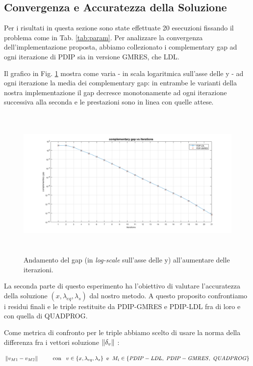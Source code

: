 \subsection{Convergenza e Accuratezza della Soluzione}

Per i risultati in questa sezione sono state effettuate 20 esecuzioni fissando il problema come in Tab. \ref{tab:param}.
Per analizzare la convergenza dell'implementazione proposta, abbiamo collezionato i complementary gap ad ogni iterazione di PDIP sia in versione GMRES, che LDL.

Il grafico in Fig. \ref{fig:gap} mostra come varia - in scala logaritmica sull'asse delle y - ad ogni iterazione la media dei complementary gap: in entrambe le varianti della nostra implementazione il gap decresce monotonamente ad ogni iterazione successiva alla seconda e le prestazioni sono in linea con quelle attese.

\begin{figure}[!h]
    \centering
    \includegraphics[width=\textwidth, height = 7.5cm]{img/MU6.png}
    \caption{Andamento del gap (in \textit{log-scale} sull'asse delle y) all'aumentare delle iterazioni. \label{fig:gap}}
\end{figure}

La seconda parte di questo esperimento ha l'obiettivo di valutare l'accuratezza della soluzione $(x, \lambda_{eq}, \lambda_s)$ dal nostro metodo. A questo proposito confrontiamo i residui finali e le triple restituite da PDIP-GMRES e PDIP-LDL fra di loro e con quella di QUADPROG. 

Come metrica di confronto per le triple abbiamo scelto di usare la norma della differenza fra i vettori soluzione $\left\lVert\delta_v\right\rVert$ :

\begin{equation}\label{ep:acc}
     \left\lVert v_{M1} - v_{M2}\right\rVert \;\;\;\;\;\;\;\;\; \mathrm{con} \;\;\; v\in \{ x, \lambda_{eq}, \lambda_s\} \;\; \mathrm{e} \;\; M_i \in \{{\scriptsize\mathit{PDIP-LDL},\; \mathit{PDIP-GMRES}, \; \mathit{QUADPROG}}\}
\end{equation}

